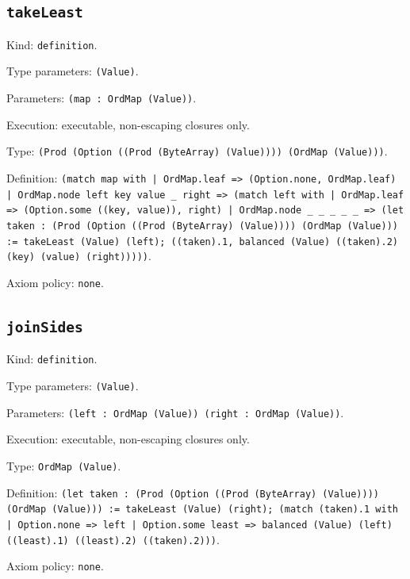 \documentclass[11pt]{article}
\begin{document}
\subsection*{\texttt{takeLeast}}
\noindent Kind: \texttt{definition}.\par
\noindent Type parameters: \texttt{(Value)}.\par
\noindent Parameters: \texttt{(map : OrdMap (Value))}.\par
\noindent Execution: executable, non-escaping closures only.\par
\noindent Type: \texttt{(Prod (Option ((Prod (ByteArray) (Value)))) (OrdMap (Value)))}.\par
\noindent Definition: \texttt{(match map with | OrdMap.leaf => (Option.none, OrdMap.leaf) | OrdMap.node left key value \_ right => (match left with | OrdMap.leaf => (Option.some ((key, value)), right) | OrdMap.node \_ \_ \_ \_ \_ => (let taken : (Prod (Option ((Prod (ByteArray) (Value)))) (OrdMap (Value))) := takeLeast (Value) (left); ((taken).1, balanced (Value) ((taken).2) (key) (value) (right)))))}.\par
\noindent Axiom policy: \texttt{none}.\par
\subsection*{\texttt{joinSides}}
\noindent Kind: \texttt{definition}.\par
\noindent Type parameters: \texttt{(Value)}.\par
\noindent Parameters: \texttt{(left : OrdMap (Value)) (right : OrdMap (Value))}.\par
\noindent Execution: executable, non-escaping closures only.\par
\noindent Type: \texttt{OrdMap (Value)}.\par
\noindent Definition: \texttt{(let taken : (Prod (Option ((Prod (ByteArray) (Value)))) (OrdMap (Value))) := takeLeast (Value) (right); (match (taken).1 with | Option.none => left | Option.some least => balanced (Value) (left) ((least).1) ((least).2) ((taken).2)))}.\par
\noindent Axiom policy: \texttt{none}.\par
\end{document}
